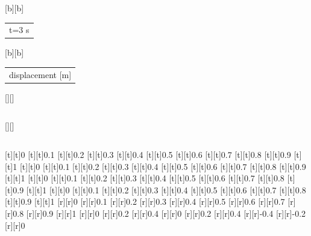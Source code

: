 \begin{psfrags}
[b][b]{\color[rgb]{0,0,0}\setlength{\tabcolsep}{0pt}\begin{tabular}{c}t=3 s\end{tabular}}%
[b][b]{\color[rgb]{0,0,0}\setlength{\tabcolsep}{0pt}\begin{tabular}{c}displacement [m]\end{tabular}}%
[][]{\color[rgb]{0,0,0}\setlength{\tabcolsep}{0pt}\begin{tabular}{c} \end{tabular}}%
[][]{\color[rgb]{0,0,0}\setlength{\tabcolsep}{0pt}\begin{tabular}{c} \end{tabular}}%
%
[t][t]{0}%
[t][t]{0.1}%
[t][t]{0.2}%
[t][t]{0.3}%
[t][t]{0.4}%
[t][t]{0.5}%
[t][t]{0.6}%
[t][t]{0.7}%
[t][t]{0.8}%
[t][t]{0.9}%
[t][t]{1}%
[t][t]{0}%
[t][t]{0.1}%
[t][t]{0.2}%
[t][t]{0.3}%
[t][t]{0.4}%
[t][t]{0.5}%
[t][t]{0.6}%
[t][t]{0.7}%
[t][t]{0.8}%
[t][t]{0.9}%
[t][t]{1}%
[t][t]{0}%
[t][t]{0.1}%
[t][t]{0.2}%
[t][t]{0.3}%
[t][t]{0.4}%
[t][t]{0.5}%
[t][t]{0.6}%
[t][t]{0.7}%
[t][t]{0.8}%
[t][t]{0.9}%
[t][t]{1}%
[t][t]{0}%
[t][t]{0.1}%
[t][t]{0.2}%
[t][t]{0.3}%
[t][t]{0.4}%
[t][t]{0.5}%
[t][t]{0.6}%
[t][t]{0.7}%
[t][t]{0.8}%
[t][t]{0.9}%
[t][t]{1}%
%
[r][r]{0}%
[r][r]{0.1}%
[r][r]{0.2}%
[r][r]{0.3}%
[r][r]{0.4}%
[r][r]{0.5}%
[r][r]{0.6}%
[r][r]{0.7}%
[r][r]{0.8}%
[r][r]{0.9}%
[r][r]{1}%
[r][r]{0}%
[r][r]{0.2}%
[r][r]{0.4}%
[r][r]{0}%
[r][r]{0.2}%
[r][r]{0.4}%
[r][r]{-0.4}%
[r][r]{-0.2}%
[r][r]{0}%
%

\end{psfrags}
